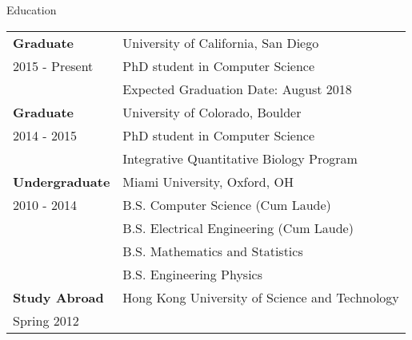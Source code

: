 \documentclass{resume} %
\begin{document}
\begin{rSection}{Education}
  \begin{tabular}{ll}
    \textbf{Graduate}    & University of California, San Diego  \\
    2015 - Present  & PhD student in Computer Science \\
                    & Expected Graduation Date: August 2018\\
    \textbf{Graduate}    & University of Colorado, Boulder \\
    2014 - 2015  & PhD student in Computer Science \\
                    & Integrative Quantitative Biology Program \\
    \textbf{Undergraduate}    & Miami University, Oxford, OH \\
    2010 - 2014   & B.S. Computer Science (Cum Laude)\\
    & B.S. Electrical Engineering (Cum Laude)\\
    & B.S. Mathematics and Statistics \\
    & B.S. Engineering Physics \\
    \textbf{Study Abroad} &  Hong Kong University of Science and Technology   \\
    Spring 2012 \\
  \end{tabular}
\end{rSection}
\end{document}
